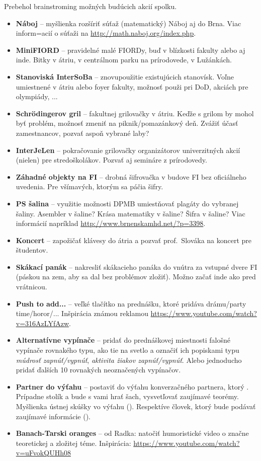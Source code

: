 \documentclass[11pt,a4paper]{article}
\begin{document}
Prebehol brainstroming možných budúcich akcií spolku.
\begin{itemize}[itemsep=0pt]
\item \textbf{Náboj} -- myšlienka rozšíriť súťaž (matematický) Náboj aj do Brna. Viac inform=acií o súťaži na \url{http://math.naboj.org/index.php}.
\item \textbf{MiniFIORD} -- pravidelné malé FIORDy, buď v blízkosti fakulty alebo aj inde. Bitky v átriu, v centrálnom parku na prírodovede, v Lužánkách.
\item \textbf{Stanoviská InterSoBa} -- znovupoužitie existujúcich stanovísk. Voľne umiestnené v átriu alebo foyer fakulty, možnosť použi pri DoD, akciách pre olympiády, ...
\item \textbf{Schrödingerov gril} --  fakultnej grilovačky v átriu. Keďže s grilom by mohol byť problém, možnosť zmeniť na piknik/pomazánkový deň. Zvážiť účasť zamestnancov, pozvať aspoň vybrané laby?
\item \textbf{InterJeLen} -- pokračovanie grilovačky organizátorov univerzitných akcií (nielen) pre stredoškolákov. Pozvať aj semináre z prírodovedy.
\item \textbf{Záhadné objekty na FI} -- drobná šifrovačka v budove FI bez oficiálneho uvedenia. Pre všímavých, ktorým sa páčia šifry.
\item \textbf{PS šalina} -- využitie možnosti DPMB umiestňovať plagáty do vybranej šaliny. Asembler v šaline? Krása matematiky v šaline? Šifra v šaline? Viac informácií napríklad \url{http://www.brnenskamhd.net/?p=3398}.
\item \textbf{Koncert} -- zapožičať klávesy do átria a pozvať prof.\ Slováka na koncert pre študentov.
\item \textbf{Skákací panák} -- nakresliť skákacieho panáka do vnútra za vstupné dvere FI (páskou na zem, aby sa dal bez problémov zložiť). Možno začať inde ako pred vrátnicou.
\item \textbf{Push to add...} -- veľké tlačítko na prednášku, ktoré pridáva drámu/party time/horor/... Inšpirácia známou reklamou \url{https://www.youtube.com/watch?v=316AzLYfAzw}.
\item \textbf{Alternatívne vypínače} -- pridať do prednáškovej miestnosti falošné vypínače rovnakého typu, ako tie na svetlo a označiť ich popiskami typu \textit{múdrosť zapnúť/vypnúť}, \textit{aktivita žiakov zapnúť/vypnúť}. Alebo jednoducho pridať ďalších 10 rovnakých neoznačených vypínačov.
\item \textbf{Partner do výťahu} -- postaviť do výťahu konverzačného partnera, ktorý . Prípadne stolík a bude s vami hrať šach, vysvetľovať zaujímavé teorémy. Myšlienka ústnej skúšky vo výťahu (). Respektíve človek, ktorý bude podávať zaujímavé informácie ().
\item \textbf{Banach-Tarski oranges} -- od Radka: natočiť humoristické video o značne teoretickej a zložitej téme. Inšpirácia: \url{https://www.youtube.com/watch?v=uFvokQUHh08}
\end{itemize}
\end{document}
